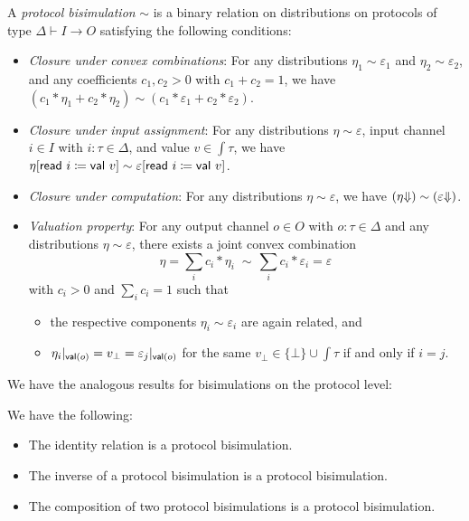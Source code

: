 \begin{definition}
A \emph{protocol bisimulation} $\sim$ is a binary relation on distributions on protocols of type $\Delta \vdash I \to O$ satisfying the following conditions:
\begin{itemize}
\item \emph{Closure under convex combinations}: For any distributions $\eta_1 \sim \varepsilon_1$ and $\eta_2 \sim \varepsilon_2$, and any coefficients $c_1, c_2 > 0$ with $c_1 + c_2 = 1$, we have $(c_1 * \eta_1 + c_2 * \eta_2) \sim (c_1 * \varepsilon_1 + c_2 * \varepsilon_2)$.

\item \emph{Closure under input assignment}: For any distributions $\eta \sim \varepsilon$, input channel $i \in I$ with $i : \tau \in \Delta$, and value $v \in \int{\tau}$, we have $\eta[\mathsf{read} \ i \coloneqq \mathsf{val} \ v] \sim \varepsilon[\mathsf{read} \ i \coloneqq \mathsf{val} \ v]$.

\item \emph{Closure under computation}: For any distributions $\eta \sim \varepsilon$, we have $({\eta \hspace{-2.5pt} \Downarrow}) \sim ({\varepsilon \hspace{-2.5pt} \Downarrow})$.

\item \emph{Valuation property}: For any output channel $o \in O$ with $o : \tau \in \Delta$ and any distributions $\eta \sim \varepsilon$, there exists a joint convex combination \[\eta = \sum_i c_i * \eta_i \; \sim \, \sum_i c_i * \varepsilon_i = \varepsilon\]
with $c_i > 0$ and $\sum_i c_i = 1$ such that
\begin{itemize}
\item the respective components $\eta_i \sim \varepsilon_i$ are again related, and
\item $\eta_i|_{\mathsf{val}(o)} = v_\bot = \varepsilon_j|_{\mathsf{val}(o)}$ for the same $v_\bot \in \{\bot\} \cup \int{\tau}$ if and only if $i = j$.
\end{itemize}
\end{itemize}
\end{definition}

\noindent We have the analogous results for bisimulations on the protocol level:

\begin{lemma}
We have the following: 
\begin{itemize}
\item The identity relation is a protocol bisimulation.
\item The inverse of a protocol bisimulation is a protocol bisimulation.
\item The composition of two protocol bisimulations is a protocol bisimulation.
\end{itemize}
\end{lemma}

